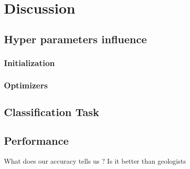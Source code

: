 \chapter{Discussion}\label{chp:discussion}
\section{Hyper parameters influence}
\subsection{Initialization}
\subsection{Optimizers}
\section{Classification Task}
\section{Performance}
What does our accuracy tells us ? Is it better than geologists